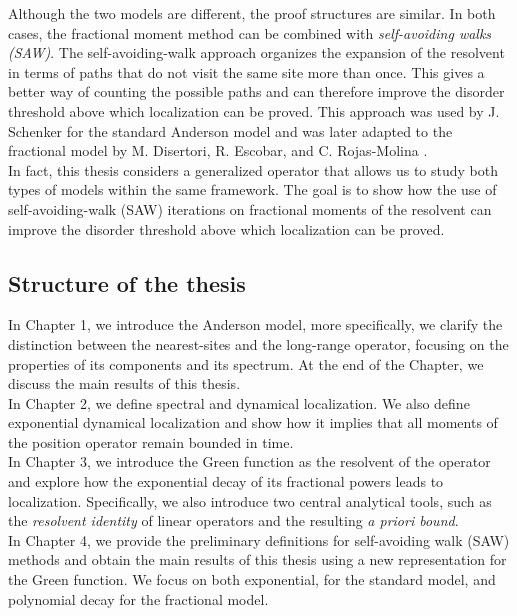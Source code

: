 \documentclass[11pt, a4paper, UKenglish, oneside]{book}
\theoremstyle{plain}
\theoremstyle{remark}
\theoremstyle{definition}
\numberwithin{equation}{section}
\numberwithin{theorem}{section}
\begin{document}
Although the two models are different, the proof structures are similar. In both cases, the fractional moment method can be combined with \textit{self-avoiding walks (SAW)}. The self-avoiding-walk approach organizes the expansion of the resolvent in terms of paths that do not visit the same site more than once. This gives a better way of counting the possible paths and can therefore improve the disorder threshold above which localization can be proved. This approach was used by J. Schenker \cite{schenker2015} for the standard Anderson model and was later adapted to the fractional model by M. Disertori, R. Escobar, and C. Rojas-Molina \cite{disertori2024}.\\

In fact, this thesis considers a generalized operator that allows us to study both types of models within the same framework. The goal is to show how the use of self-avoiding-walk (SAW) iterations on fractional moments of the resolvent can improve the disorder threshold above which localization can be proved.
\subsection*{Structure of the thesis}
In Chapter 1, we introduce the Anderson model, more specifically, we clarify the distinction between the nearest-sites and the long-range operator, focusing on the properties of its components and its spectrum. At the end of the Chapter, we discuss the main results of this thesis.\\

\noindent
In Chapter 2, we define spectral and dynamical localization. We also define exponential dynamical localization and show how it implies that all moments of the position operator remain bounded in time.\\

\noindent
In Chapter 3, we introduce the Green function as the resolvent of the operator and explore how the exponential decay of its fractional powers leads to localization. Specifically, we also introduce two central analytical tools, such as the \textit{resolvent identity} of linear operators and the resulting \textit{a priori bound}.\\

\noindent
In Chapter 4, we provide the preliminary definitions for self-avoiding walk (SAW) methods and obtain the main results of this thesis using a new representation for the Green function. We focus on both exponential, for the standard model, and polynomial decay for the fractional model. \\
\end{document}
